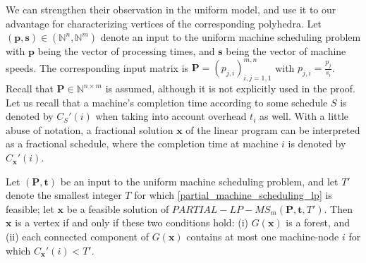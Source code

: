 \documentclass[a4paper,UKenglish,cleveref, autoref, thm-restate, pdfa]{lipics-v2021}
\theoremstyle{plain}
\begin{document}
We can strengthen their observation in the uniform model, and use it to our advantage for characterizing vertices of the corresponding polyhedra. Let $(\bm{p}, \bm{s}) \in (\mathbb{N}^{n}, \mathbb{N}^{m})$ denote an input to the uniform machine scheduling problem with $\bm{p}$ being the vector of processing times, and $\bm{s}$ being the vector of machine speeds. The corresponding input matrix is $\bm{P} = (p_{j,i})_{i,j = 1, 1} ^{m, n}$ with $p_{j,i} = \frac{p_j}{s_i}$. Recall that $\bm{P} \in \mathbb{N}^{n \times m}$ is assumed, although it is not explicitly used in the proof. Let us recall that a machine's completion time according to some schedule $S$ is denoted by $C_S'(i)$ when taking into account overhead $t_i$ as well. With a little abuse of notation, a fractional solution $\bm{x}$ of the linear program can be interpreted as a fractional schedule, where the completion time at machine $i$ is denoted by $C_{\bm{x}}'(i)$.

\begin{lmm}\label{vertex_char}
    Let $(\bm{P}, \bm{t})$ be an input to the uniform machine scheduling problem, and let $T'$ denote the smallest integer $T$ for which \eqref{partial_machine_scheduling_lp} is feasible; let $\bm{x}$ be a feasible solution of $PARTIAL-LP-MS_m (\bm{P}, \bm{t}, T')$. Then $\bm{x}$ is a vertex if and only if these two conditions hold: (i) $G(\bm{x})$ is a forest, and (ii) each connected component of $G(\bm{x})$ contains at most one machine-node $i$ for which $C_{\bm{x}}'(i)<T'$.
\end{lmm}
\end{document}
